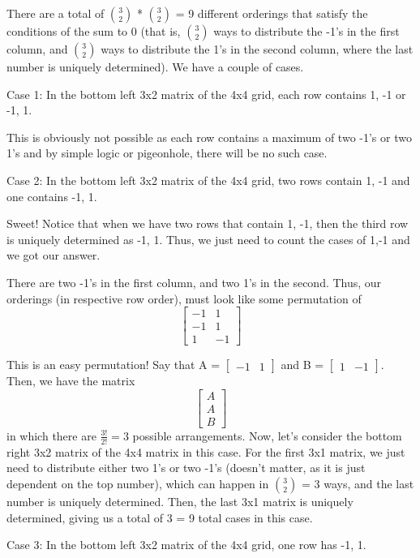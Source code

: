 \begin{enumerate}
 There are a total of \( 3 \choose 2 \) * \( 3 \choose 2 \) = 9 different orderings that satisfy the conditions of the sum to 0 (that is, \( 3 \choose 2 \) ways to distribute the -1's in the first column, and \( 3 \choose 2 \) ways to distribute the 1's in the second column, where the last number is uniquely determined). We have a couple of cases.

 Case 1: In the bottom left 3x2 matrix of the 4x4 grid, each row contains 1, -1 or -1, 1.

 This is obviously not possible as each row contains a maximum of two -1's or two 1's and by simple logic or pigeonhole, there will be no such case.

 Case 2: In the bottom left 3x2 matrix of the 4x4 grid, two rows contain 1, -1 and one contains -1, 1.

 Sweet! Notice that when we have two rows that contain 1, -1, then the third row is uniquely determined as -1, 1. Thus, we just need to count the cases of 1,-1 and we got our answer.

 There are two -1's in the first column, and two 1's in the second. Thus, our orderings (in respective row order), must look like some permutation of
 \[\begin{bmatrix} -1 & 1 \\ -1 & 1 \\ 1 & -1 \end{bmatrix}\]

 This is an easy permutation! Say that A = \( \begin{bmatrix}-1 & 1\end{bmatrix} \) and B = \( \begin{bmatrix}1 & -1\end{bmatrix} \). Then, we have the matrix
 \[\begin{bmatrix} A \\ A \\ B \end{bmatrix}\]in which there are \(\frac{3!}{2!} = 3\) possible arrangements. Now, let's consider the bottom right 3x2 matrix of the 4x4 matrix in this case. For the first 3x1 matrix, we just need to distribute either two 1's or two -1's (doesn't matter, as it is just dependent on the top number), which can happen in \( 3 \choose 2 \) = 3 ways, and the last number is uniquely determined. Then, the last 3x1 matrix is uniquely determined, giving us a total of 3  = 9 total cases in this case.

 Case 3: In the bottom left 3x2 matrix of the 4x4 grid, one row has -1, 1.


\end{enumerate}
